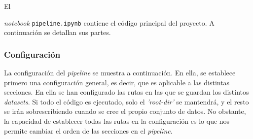 El {\textit{notebook} \texttt{pipeline.ipynb} contiene el código principal del proyecto. A continuación se detallan sus partes.

\subsubsection{Configuración}

La configuración del \textit{pipeline} se muestra a continuación. En ella, se establece primero una configuración general, es decir, que es aplicable a
las distintas secciones. En ella se han configurado las rutas en las que se guardan los distintos \textit{datasets}. Si todo el código es ejecutado, solo el
\textit{'root-dir'} se mantendrá, y el resto se irán sobrescribiendo cuando se cree el propio conjunto de datos. No obstante, la capacidad de establecer todas
las rutas en la configuración es lo que nos permite cambiar el orden de las secciones en el \textit{pipeline}. 

}
